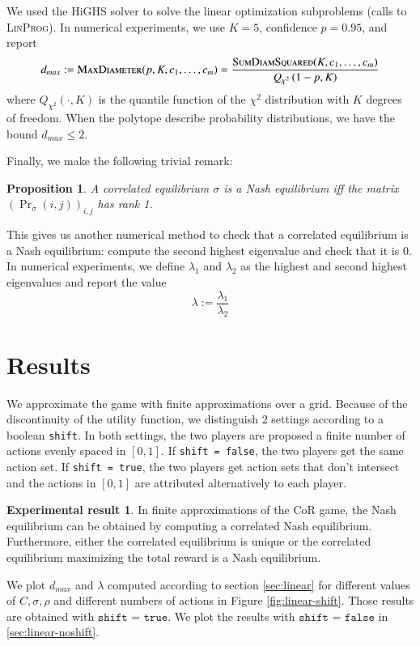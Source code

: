 \documentclass[preprint,12pt,authoryear,doubleblind]{elsarticle}
\newtheorem{proposition}[theorem]{Proposition}
\theoremstyle{definition}
\newtheorem{result}[theorem]{Experimental result}
\begin{document}
We used the HiGHS solver \citep{huangfu2018parallelizing} to solve the linear optimization subproblems (calls to \textsc{LinProg}). In numerical experiments, we use $K=5$, confidence $p=0.95$, and report $$d_{max} :=  \textsc{MaxDiameter}(p, K, c_1, \ldots, c_m) = \frac{\textsc{SumDiamSquared}(K, c_1, \ldots, c_m)} {Q_{\chi^2}\left(1-p, K\right)}$$ where $Q_{\chi^2}(\cdot, K)$ is the quantile function of the $\chi^2$ distribution with $K$ degrees of freedom. When the polytope describe probability distributions, we have the bound $d_{max} \leq 2$.

Finally, we make the following trivial remark:

\begin{proposition}
    A correlated equilibrium $\sigma$ is a Nash equilibrium iff the matrix $(\Pr\nolimits_\sigma(i, j))_{i,j}$ has rank 1.
\end{proposition}

This gives us another numerical method to check that a correlated equilibrium is a Nash equilibrium: compute the second highest eigenvalue and check that it is $0$. In numerical experiments, we define $\lambda_1$ and $\lambda_2$ as the highest and second highest eigenvalues and report the value $$\lambda := \frac{\lambda_1}{\lambda_2}$$



\section{Results}

We approximate the game with finite approximations over a grid. Because of the discontinuity of the utility function, we distinguish 2 settings according to a boolean \texttt{shift}. In both settings, the two players are proposed a finite number of actions evenly spaced in $[0, 1]$. If \texttt{shift = false}, the two players get the same action set. If \texttt{shift = true}, the two players get action sets that don't intersect and the actions in $[0, 1]$ are attributed alternatively to each player.

\begin{result}
In finite approximations of the CoR game, the Nash equilibrium can be obtained by computing a correlated Nash equilibrium. Furthermore, either the correlated equilibrium is unique or the correlated equilibrium maximizing the total reward is a Nash equilibrium.
\end{result}

We plot $d_{max}$ and $\lambda$ computed according to section \ref{sec:linear} for different values of $C, \sigma, \rho$ and different numbers of actions in Figure \ref{fig:linear-shift}. Those results are obtained with $\texttt{shift = true}$. We plot the results with $\texttt{shift = false}$ in \ref{sec:linear-noshift}.
\end{document}
